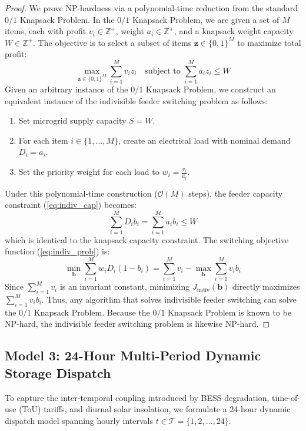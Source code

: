 \documentclass[11pt,a4paper]{article}
\theoremstyle{definition}
\theoremstyle{remark}
\begin{document}
\begin{proof}
We prove NP-hardness via a polynomial-time reduction from the standard $0/1$ Knapsack Problem. In the $0/1$ Knapsack Problem, we are given a set of $M$ items, each with profit $v_i \in \mathbb{Z}^+$, weight $a_i \in \mathbb{Z}^+$, and a knapsack weight capacity $W \in \mathbb{Z}^+$. The objective is to select a subset of items $\mathbf{z} \in \{0, 1\}^M$ to maximize total profit:
\begin{equation}
\max_{\mathbf{z} \in \{0, 1\}^M} \sum_{i=1}^M v_i z_i \quad \text{subject to } \sum_{i=1}^M a_i z_i \le W
\end{equation}
Given an arbitrary instance of the $0/1$ Knapsack Problem, we construct an equivalent instance of the indivisible feeder switching problem as follows:
\begin{enumerate}
    \item Set microgrid supply capacity $S = W$.
    \item For each item $i \in \{1, \dots, M\}$, create an electrical load with nominal demand $D_i = a_i$.
    \item Set the priority weight for each load to $w_i = \frac{v_i}{a_i}$.
\end{enumerate}
Under this polynomial-time construction ($\mathcal{O}(M)$ steps), the feeder capacity constraint (\ref{eq:indiv_cap}) becomes:
\begin{equation}
\sum_{i=1}^M D_i b_i = \sum_{i=1}^M a_i b_i \le W
\end{equation}
which is identical to the knapsack capacity constraint. The switching objective function (\ref{eq:indiv_prob}) is:
\begin{equation}
\min_{\mathbf{b}} \sum_{i=1}^M w_i D_i (1 - b_i) = \sum_{i=1}^M v_i - \max_{\mathbf{b}} \sum_{i=1}^M v_i b_i
\end{equation}
Since $\sum_{i=1}^M v_i$ is an invariant constant, minimizing $J_{\text{indiv}}(\mathbf{b})$ directly maximizes $\sum_{i=1}^M v_i b_i$. Thus, any algorithm that solves indivisible feeder switching can solve the $0/1$ Knapsack Problem. Because the $0/1$ Knapsack Problem is known to be NP-hard, the indivisible feeder switching problem is likewise NP-hard.
\end{proof}

\subsection{Model 3: 24-Hour Multi-Period Dynamic Storage Dispatch}
To capture the inter-temporal coupling introduced by BESS degradation, time-of-use (ToU) tariffs, and diurnal solar insolation, we formulate a 24-hour dynamic dispatch model spanning hourly intervals $t \in \mathcal{T} = \{1, 2, \dots, 24\}$.
\end{document}
